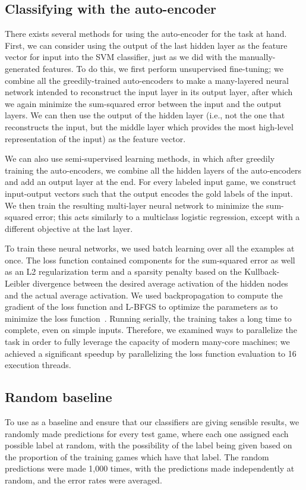 \documentclass[11pt]{article}
\begin{document}
\subsection{Classifying with the auto-encoder}
\label{sec:classifying-auto-encoder}
There exists several methods for using the auto-encoder for the task at hand. First, we can consider using the output of the last hidden layer as the feature vector for input into the SVM classifier, just as we did with the manually-generated features. To do this, we first perform unsupervised fine-tuning; we combine all the greedily-trained auto-encoders to make a many-layered neural network intended to reconstruct the input layer in its output layer, after which we again minimize the sum-squared error between the input and the output layers. We can then use the output of the hidden layer (i.e., not the one that reconstructs the input, but the middle layer which provides the most high-level representation of the input) as the feature vector.

We can also use semi-supervised learning methods, in which after greedily training the auto-encoders, we combine all the hidden layers of the auto-encoders and add an output layer at the end. For every labeled input game, we construct input-output vectors such that the output encodes the gold labels of the input. We then train the resulting multi-layer neural network to minimize the sum-squared error; this acts similarly to a multiclass logistic regression, except with a different objective at the last layer.

To train these neural networks, we used batch learning over all the examples at once. The loss function contained components for the sum-squared error as well as an L2 regularization term and a sparsity penalty based on the Kullback-Leibler divergence between the desired average activation of the hidden nodes and the actual average activation. We used backpropagation to compute the gradient of the loss function and L-BFGS to optimize the parameters as to minimize the loss function~\cite{ng-lecturenotes}. Running serially, the training takes a long time to complete, even on simple inputs. Therefore, we examined ways to parallelize the task in order to fully leverage the capacity of modern many-core machines; we achieved a significant speedup by parallelizing the loss function evaluation to 16 execution threads.

\subsection{Random baseline}
To use as a baseline and ensure that our classifiers are giving sensible results, we randomly made predictions for every test game, where each one assigned each possible label at random, with the possibility of the label being given based on the proportion of the training games which have that label. The random predictions were made 1,000 times, with the predictions made independently at random, and the error rates were averaged.
\end{document}
